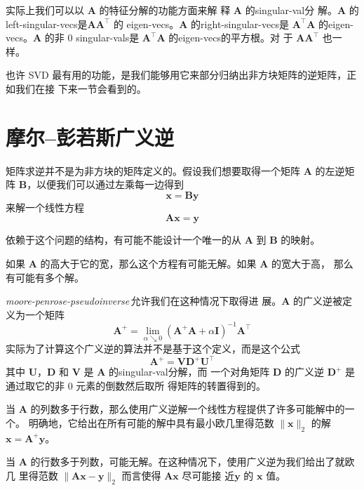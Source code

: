 实际上我们可以以 $\pmb{A}$ 的特征分解的功能方面来解
释 $\pmb{A}$ 的\gls*{singular-val}分
解。$\pmb{A}$ 的\gls*{left-singular-vecs}是$\pmb{A}\pmb{A}^{\top}$ 的
\gls*{eigen-vecs}。$\pmb{A}$ 的\gls*{right-singular-vecs}是
$\pmb{A}^{\top}\pmb{A}$ 的\gls*{eigen-vecs}。$\pmb{A}$ 的非 $0$
\gls*{singular-vals}是 $\pmb{A}^{\top}\pmb{A}$ 的\gls*{eigen-vecs}的平方根。对
于 $\pmb{A}\pmb{A}^{\top}$ 也一样。

也许 SVD 最有用的功能，是我们能够用它来部分归纳出非方块矩阵的逆矩阵，正如我们在接
下来一节会看到的。

\section{摩尔--彭若斯广义逆}
\label{sec:the_moore_penrose_pseudoinverse}

矩阵求逆并不是为非方块的矩阵定义的。假设我们想要取得一个矩阵 $\pmb{A}$ 的左逆矩
阵 $\pmb{B}$，以便我们可以通过左乘每一边得到
\begin{equation}
  \pmb{x} = \pmb{B}\pmb{y}
\end{equation}
来解一个线性方程
\begin{equation}
  \pmb{A}\pmb{x} = \pmb{y}
\end{equation}

依赖于这个问题的结构，有可能不能设计一个唯一的从 $\pmb{A}$ 到 $\pmb{B}$ 的映射。

如果 $\pmb{A}$ 的高大于它的宽，那么这个方程有可能无解。如果 $\pmb{A}$ 的宽大于高，
那么有可能有多个解。

\emph{\gls{moore-penrose-pseudoinverse}}\,允许我们在这种情况下取得进
展。$\pmb{A}$ 的广义逆被定义为一个矩阵
\begin{equation}
  \pmb{A}^+ = \lim_{\alpha \searrow 0}(\pmb{A}^+\pmb{A} +
  \alpha\pmb{I})^{-1}\pmb{A}^{\top}
\end{equation}
实际为了计算这个广义逆的算法并不是基于这个定义，而是这个公式
\begin{equation}
  \pmb{A}^+ = \pmb{V}\pmb{D}^+\pmb{U}^{\top}
\end{equation}
其中 $\pmb{U}$，$\pmb{D}$ 和 $\pmb{V}$ 是 $\pmb{A}$ 的\gls*{singular-val}分解，而
一个对角矩阵 $\pmb{D}$ 的广义逆 $\pmb{D}^+$ 是通过取它的非 $0$ 元素的倒数然后取所
得矩阵的转置得到的。

当 $\pmb{A}$ 的列数多于行数，那么使用广义逆解一个线性方程提供了许多可能解中的一个。
明确地，它给出在所有可能的解中具有最小欧几里得范数 $\|\pmb{x}\|_2$ 的解$\pmb{x}
= \pmb{A}^+\pmb{y}$。

当 $\pmb{A}$ 的行数多于列数，可能无解。在这种情况下，使用广义逆为我们给出了就欧几
里得范数 $\|\pmb{A}\pmb{x} - \pmb{y}\|_2$ 而言使得 $\pmb{A}\pmb{x}$ 尽可能接
近$\pmb{y}$ 的 $\pmb{x}$ 值。

